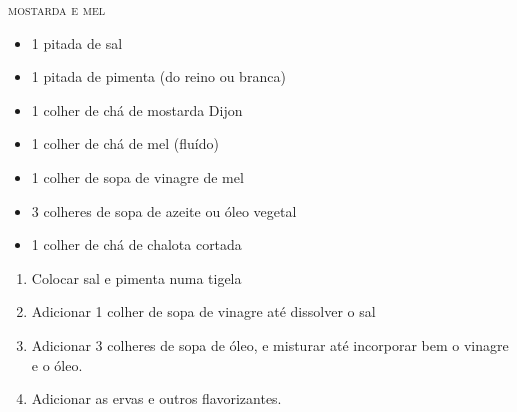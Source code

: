 {\begin{multicols}{2}
\textsc{mostarda e mel}
\begin{itemize}
  \item 1 pitada de sal
  \item 1 pitada de pimenta (do reino ou branca)
  \item 1 colher de chá de mostarda Dijon
  \item 1 colher de chá de mel (fluído)
  \item 1 colher de sopa de vinagre de mel
  \item 3 colheres de sopa de azeite ou óleo vegetal
  \item 1 colher de chá de chalota cortada
\end{itemize}

\end{multicols}
}
{
\begin{enumerate}
  \item Colocar sal e pimenta numa tigela
  \item Adicionar 1 colher de sopa de vinagre até dissolver o sal
  \item Adicionar 3 colheres de sopa de óleo, e misturar até incorporar bem o vinagre e o óleo.
  \item Adicionar as ervas e outros flavorizantes.
\end{enumerate}
}
